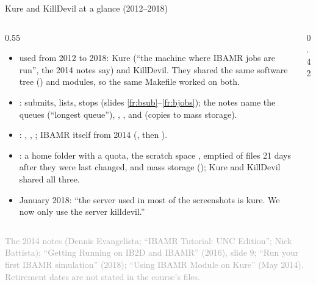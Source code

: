 \documentclass[aspectratio=169,11pt]{beamer}
\newcommand{\sourcecredit}[1]{\vfill\begin{flushright}\tiny\textcolor{DarkGray}{#1}\end{flushright}}
\begin{document}
\begin{frame}{Kure and KillDevil at a glance (2012--2018)}
\label{fr:kkglance}
\begin{columns}[T,onlytextwidth]
\begin{column}{0.55\textwidth}
\scriptsize
\begin{itemize}\setlength{\itemsep}{1.5pt}
  \item {} used from 2012 to 2018: Kure (``the machine where IBAMR jobs are run'', the 2014 notes say) and KillDevil. They shared the same software tree () and modules, so the same Makefile worked on both.
  \item {}:  submits,  lists,  stops (slides \ref{fr:bsub}--\ref{fr:bjobs}); the notes name the queues  (``longest queue''), , ,  and  (copies to mass storage).
  \item {}: , , ; IBAMR itself from 2014 (, then ).
  \item {}: a home folder with a quota, the scratch space , emptied of files 21 days after they were last changed, and mass storage (); Kure and KillDevil shared all three.
  \item January 2018: ``the server used in most of the screenshots is kure. We now only use the server killdevil.''
\end{itemize}
\end{column}
\begin{column}{0.42\textwidth}
\centering
{}
\end{column}
\end{columns}
\sourcecredit{The 2014 notes (Dennis Evangelista; ``IBAMR Tutorial: UNC Edition''; Nick Battista); ``Getting Running on IB2D and IBAMR'' (2016), slide 9; ``Run your first IBAMR simulation'' (2018); ``Using IBAMR Module on Kure'' (May 2014). Retirement dates are not stated in the course's files.}
\end{frame}
\end{document}
